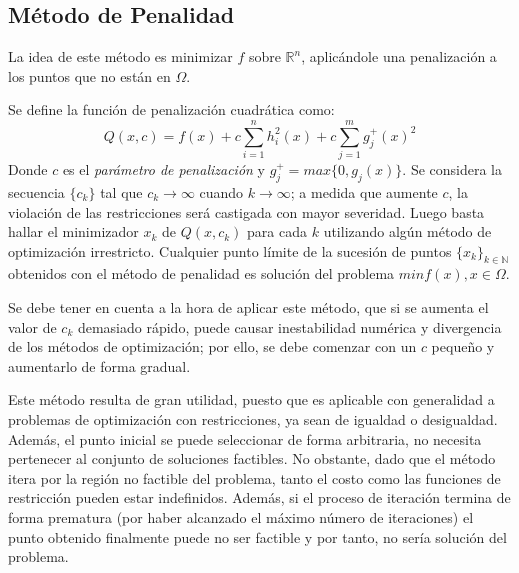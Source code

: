 \documentclass[titlepage, 11pt]{scrartcl}
\begin{document}
	\subsection{Método de Penalidad}
	La idea de este método es minimizar $f$ sobre $\mathbb{R}^n$, aplicándole una penalización a los puntos que no están en $\Omega$. 
	
	Se define la función de penalización cuadrática como:
	\begin{equation*}
		Q(x, c) = f(x) + c \sum_{i = 1}^{n}h_i^2(x) + c \sum_{j = 1}^{m}g_j^+(x)^2
	\end{equation*}
	Donde $c$ es el \textit{parámetro de penalización} y $g_j^+ = max\{0, g_j(x)\}$. Se considera la secuencia $\{c_k\}$ tal que $c_k \rightarrow \infty$ cuando $k \rightarrow \infty$; a medida que aumente $c$, la violación de las restricciones será castigada con mayor severidad. Luego basta hallar el minimizador $x_k$ de $Q(x, c_k)$ para cada $k$ utilizando algún método de optimización irrestricto. Cualquier punto límite de la sucesión de puntos $\{x_k\}_{k \in \mathbb{N}}$ obtenidos con el método de penalidad es solución del problema $min f(x), x\in \Omega$.
	
	Se debe tener en cuenta a la hora de aplicar este método, que si se aumenta el valor de $c_k$ demasiado rápido, puede causar inestabilidad numérica y divergencia de los métodos de optimización; por ello, se debe comenzar con un $c$ pequeño y aumentarlo de forma gradual.
	
	Este método resulta de gran utilidad, puesto que es aplicable con generalidad a problemas de optimización con restricciones, ya sean de igualdad o desigualdad. Además, el punto inicial se puede seleccionar de forma arbitraria, no necesita pertenecer al conjunto de soluciones factibles. No obstante, dado que el método itera por la región no factible del problema, tanto el costo como las funciones de restricción pueden estar indefinidos. Además, si el proceso de iteración termina de forma prematura (por haber alcanzado el máximo número de iteraciones) el punto obtenido finalmente puede no ser factible y por tanto, no sería solución del problema.
	
\end{document}
